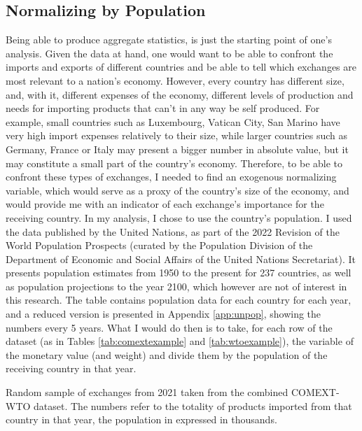 \subsection{Normalizing by Population}
Being able to produce aggregate statistics, is just the starting point of one's analysis. Given the data at hand, one would want to be able to confront the imports and exports of different countries and be able to tell which exchanges are most relevant to a nation's economy. However, every country has different size, and, with it, different expenses of the economy, different levels of production and needs for importing products that can't in any way be self produced. For example, small countries such as Luxembourg, Vatican City, San Marino have very high import expenses relatively to their size, while larger countries such as Germany, France or Italy may present a bigger number in absolute value, but it may constitute a small part of the country's economy.
Therefore, to be able to confront these types of exchanges, I needed to find an exogenous normalizing variable, which would serve as a proxy of the country's size of the economy, and would provide me with an indicator of each exchange's importance for the receiving country. 
In my analysis, I chose to use the country's population. I used the data published by the United Nations, as part of the 2022 Revision of the World Population Prospects \cite{un2022population} (curated by the Population Division of the Department of Economic and Social Affairs of the United Nations Secretariat). It presents population estimates from 1950 to the present for 237 countries, as well as population projections to the year 2100, which however are not of interest in this research. The table contains population data for each country for each year, and a reduced version is presented in Appendix \ref{app:unpop}, showing the numbers every 5 years.
What I would do then is to take, for each row of the dataset (as in Tables \ref{tab:comextexample} and \ref{tab:wtoexample}), the variable of the monetary value (and weight) and divide them by the population of the receiving country in that year. 

\begin{table}[t]
    \centering
    
    \caption[Random sample of exchanges from 2021 taken from the combined COMEXT-WTO dataset]{Random sample of exchanges from 2021 taken from the combined COMEXT-WTO dataset. The numbers refer to the totality of products imported from that country in that year, the population in expressed in thousands.}
    \label{tab:normexample}
\end{table}

